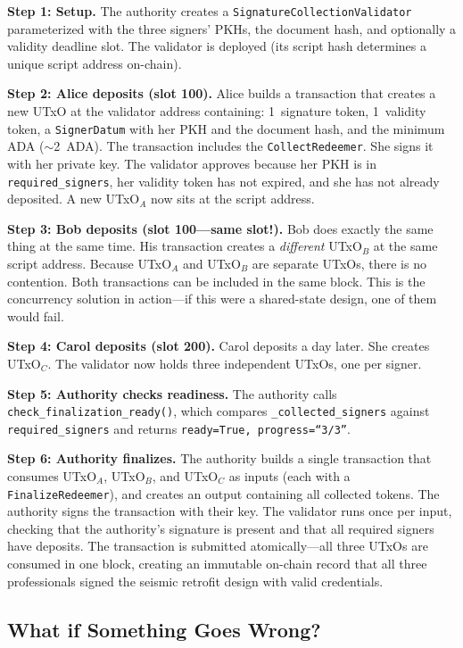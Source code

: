 \textbf{Step 1: Setup.} The authority creates a
\texttt{SignatureCollectionValidator} parameterized with the three
signers' PKHs, the document hash, and optionally a validity deadline
slot. The validator is deployed (its script hash determines a unique
script address on-chain).

\textbf{Step 2: Alice deposits (slot 100).} Alice builds a transaction
that creates a new UTxO at the validator address containing:
1~signature token, 1~validity token, a \texttt{SignerDatum} with her
PKH and the document hash, and the minimum ADA (${\sim}$2~ADA). The
transaction includes the \texttt{CollectRedeemer}. She signs it with
her private key. The validator approves because her PKH is in
\texttt{required\_signers}, her validity token has not expired, and she
has not already deposited. A new UTxO$_A$ now sits at the script
address.

\textbf{Step 3: Bob deposits (slot 100---same slot!).} Bob does exactly
the same thing at the same time. His transaction creates a \emph{different}
UTxO$_B$ at the same script address. Because UTxO$_A$ and UTxO$_B$ are
separate UTxOs, there is no contention. Both transactions can be
included in the same block. This is the concurrency solution in
action---if this were a shared-state design, one of them would fail.

\textbf{Step 4: Carol deposits (slot 200).} Carol deposits a day later.
She creates UTxO$_C$. The validator now holds three independent UTxOs,
one per signer.

\textbf{Step 5: Authority checks readiness.} The authority calls
\texttt{check\_finalization\_ready()}, which compares
\texttt{\_collected\_signers} against \texttt{required\_signers} and
returns \texttt{ready=True, progress=``3/3''}.

\textbf{Step 6: Authority finalizes.} The authority builds a single
transaction that consumes UTxO$_A$, UTxO$_B$, and UTxO$_C$ as inputs
(each with a \texttt{FinalizeRedeemer}), and creates an output
containing all collected tokens. The authority signs the transaction
with their key. The validator runs once per input, checking that the
authority's signature is present and that all required signers have
deposits. The transaction is submitted atomically---all three UTxOs are
consumed in one block, creating an immutable on-chain record that all
three professionals signed the seismic retrofit design with valid
credentials.

\subsection{What if Something Goes Wrong?}

